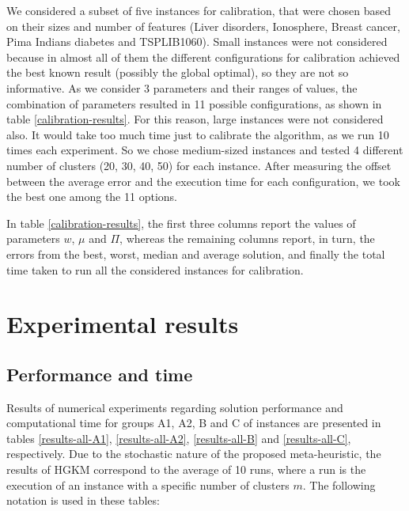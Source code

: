 We considered a subset of five instances for calibration, that were chosen based on their sizes and number of features (Liver disorders, Ionosphere, Breast cancer, Pima Indians diabetes and TSPLIB1060). Small instances were not considered because in almost all of them the different configurations for calibration achieved the best known result (possibly the global optimal), so they are not so informative. As we consider 3 parameters and their ranges of values, the combination of parameters resulted in 11 possible configurations, as shown in table \ref{calibration-results}. For this reason, large instances were not considered also. It would take too much time just to calibrate the algorithm, as we run 10 times each experiment. So we chose medium-sized instances and tested 4 different number of clusters (20, 30, 40, 50) for each instance. After measuring the offset between the average error and the execution time for each configuration, we took the best one among the 11 options.

In table \ref{calibration-results}, the first three columns report the values of parameters $w$, $\mu$ and $\Pi$, whereas the remaining columns report, in turn, the errors from the best, worst, median and average solution, and finally the total time taken to run all the considered instances for calibration.



\section{Experimental results}
\label{sec:results}

\subsection{Performance and time}
\label{sec:performance}
Results of numerical experiments regarding solution performance and computational time for groups A1, A2, B and C of instances are presented in tables \ref{results-all-A1}, \ref{results-all-A2}, \ref{results-all-B} and \ref{results-all-C}, respectively. Due to the stochastic nature of the proposed meta-heuristic, the results of HGKM correspond to the average of 10 runs, where a run is the execution of an instance with a specific number of clusters $m$. The following notation is used in these tables:

